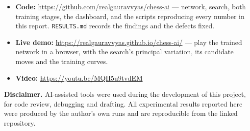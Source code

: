 \documentclass{article}
\begin{document}
\begin{itemize}[noitemsep]
  \item \textbf{Code:} \url{https://github.com/realgauravvyas/chess-ai}
        --- network, search, both training stages, the dashboard, and the
        scripts reproducing every number in this report.
        \texttt{RESULTS.md} records the findings and the defects fixed.
  \item \textbf{Live demo:} \url{https://realgauravvyas.github.io/chess-ai/} --- play the trained
        network in a browser, with the search's principal variation, its
        candidate moves and the training curves.
  \item \textbf{Video:} \url{https://youtu.be/MQH5u9tvdEM}
\end{itemize}

\noindent
\noindent\textbf{Disclaimer.} AI-assisted tools were used during the
development of this project, for code review, debugging and drafting. All
experimental results reported here were produced by the author's own runs
and are reproducible from the linked repository.

\vfill\pagebreak
{\fontsize{8}{9}\selectfont


}
\end{document}
